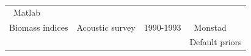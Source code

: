 \documentclass[
]{article}
\begin{document}
\begin{longtable}[]{@{}llll@{}}
\begin{minipage}[t]{0.33\columnwidth}
~Matlab\strut
\end{minipage}\tabularnewline
\begin{minipage}[t]{0.21\columnwidth}\raggedright
Biomass indices\strut
\end{minipage} & \begin{minipage}[t]{0.20\columnwidth}\raggedright
Acoustic survey\strut
\end{minipage} & \begin{minipage}[t]{0.15\columnwidth}\raggedright
1990-1993\strut
\end{minipage} & \begin{minipage}[t]{0.33\columnwidth}\raggedright
~Monstad\strut
\end{minipage}\tabularnewline
\begin{minipage}[t]{0.21\columnwidth}\raggedright
\strut
\end{minipage} & \begin{minipage}[t]{0.20\columnwidth}\raggedright
\strut
\end{minipage} & \begin{minipage}[t]{0.15\columnwidth}\raggedright
\strut
\end{minipage} & \begin{minipage}[t]{0.33\columnwidth}\raggedright
Default priors\strut
\end{minipage}\tabularnewline
\bottomrule
\end{longtable}
\end{document}

